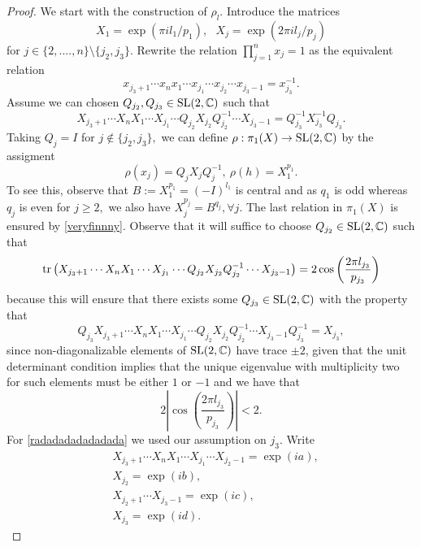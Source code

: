 \begin{proof} We start with the construction of $\rho_l.$ Introduce the matrices $$X_1=\exp(\pi i l_1/p_1), \ \ \ X_j=\exp(2\pi il_j/p_j)$$
for $j\in \{2,....,n\}\setminus \{j_2,j_3\}.$ 
Rewrite the relation $\prod_{j=1}^n x_j=1$ as the equivalent relation $$x_{{j_3}+1}\cdots x_n x_1\cdots x_{j_1} \cdots x_{j_2}\cdots x_{j_{3}-1}=x_{j_3}^{-1}.$$ 
 Assume we can chosen $Q_{j_2},Q_{j_3} \in \operatorname{SL}(2,\mathbb{C})$ such that
\begin{equation} \label{veryfinnny}
X_{{j_3}+1}\cdots X_n X_1\cdots X_{j_1} \cdots Q_{j_2}X_{j_2}Q_{j_2}^{-1}\cdots X_{j_{3}-1}=Q_{j_3}^{-1}X_{j_3}^{-1}Q_{j_3}.
\end{equation}
Taking $Q_j=I$ for $j\notin \{j_2,j_3\},$ we can define $\rho:\pi_1(X)\rightarrow \operatorname{SL}(2,\mathbb{C})$ by the assigment
\begin{equation}
\rho(x_j)=Q_jX_jQ_j^{-1}, \ \rho(h)=X_1^{p_1}.
\end{equation}
To see this, observe that $B:=X_1^{p_1}=(-I)^{l_1}$ is central and  as $q_1$ is odd whereas $q_j$ is even for $j\geq 2,$ we also have  $X_j^{p_j}=B^{q_j}, \forall j.$ The last relation in $\pi_1(X)$ is ensured by  \eqref{veryfinnny}. Observe that it will suffice to choose $Q_{j_2} \in \operatorname{SL}(2,\mathbb{C})$ such that
\begin{equation} \label{radadadadadadada}
 \operatorname{tr} \left( X_{{j_3}+1}\cdots X_n X_1\cdots X_{j_1} \cdots Q_{j_2}X_{j_2}Q_{j_2}^{-1}\cdots X_{j_{3}-1} \right) =2  \cos\left( \frac{2\pi l_{j_3}}{p_{j_3}}\right) 
\end{equation}
because this will ensure that there exists some $Q_{j_3} \in \operatorname{SL}(2,\mathbb{C})$ with the property that
$$Q_{j_3} X_{{j_3}+1}\cdots X_n X_1\cdots X_{j_1} \cdots Q_{j_2}X_{j_2}Q_{j_2}^{-1}\cdots X_{j_{3}-1} Q_{j_3}^{-1}=X_{j_3},$$ 
since non-diagonalizable elements of $ \operatorname{SL}(2,\mathbb{C})$ have trace $\pm2$, given that the unit determinant condition implies that the unique eigenvalue with multiplicity two for such elements must be either $1$ or $-1$ and we have that
$$2  \left|\cos\left( \frac{2\pi l_{j_3}}{p_{j_3}}\right) \right|<2.$$
For \eqref{radadadadadadada} we used our assumption on $j_3.$ Write
\begin{align}
&X_{{j_3}+1}\cdots X_n X_1\cdots X_{j_1} \cdots X_{j_2-1}=\exp(ia),
\\ &X_{j_2}=\exp(ib),
 \\ &X_{j_2+1} \cdots X_{j_{3}-1}=\exp(ic),
 \\ &X_{j_3} =\exp(id).
\end{align}

\end{proof}
